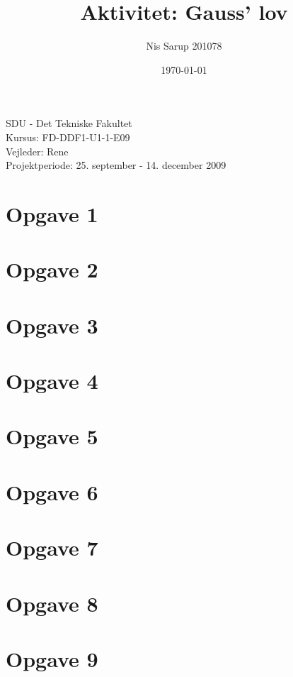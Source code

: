 \documentclass[a4wide,10pt]{article}
\begin{document}
\title{Aktivitet: Gauss’ lov}
\author{Nis Sarup 201078}
\date{\today}
\maketitle
\begin{center}
	SDU - Det Tekniske Fakultet\\
	Kursus: FD-DDF1-U1-1-E09\\
	Vejleder: Rene \\
	Projektperiode: 25. september - 14. december 2009\\
\end{center}
\newpage

\section{Opgave 1} %
\label{sec:opgave_1}

\newpage

\section{Opgave 2} %
\label{sec:opgave_2}


\section{Opgave 3} %
\label{sec:opgave_3}


\section{Opgave 4} %
\label{sec:opgave_4}

\newpage

\section{Opgave 5} %
\label{sec:opgave_5}


\section{Opgave 6} %
\label{sec:opgave_6}


\section{Opgave 7} %
\label{sec:opgave_7}

\newpage

\section{Opgave 8} %
\label{sec:opgave_8}


\section{Opgave 9} %
\label{sec:opgave_9}

\end{document}
